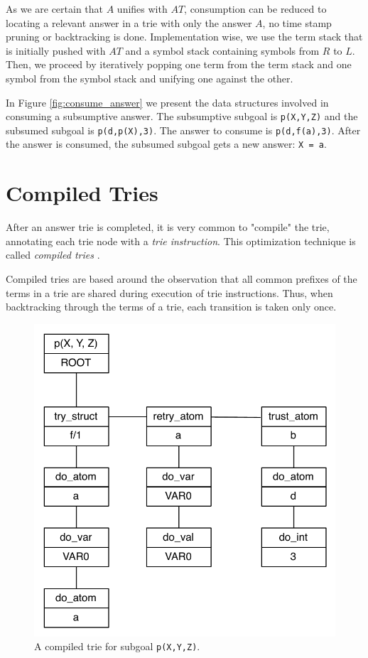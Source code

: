 As we are certain that $A$ unifies with $AT$, consumption can be reduced to locating a relevant
answer in a trie with only the answer $A$, no time stamp pruning or backtracking is done.
Implementation wise, we use the term stack that is initially pushed with $AT$
and a symbol stack containing symbols from $R$ to $L$. Then, we proceed by
iteratively popping one term from the term stack and one symbol from the symbol stack
and unifying one against the other.

In Figure \ref{fig:consume_answer} we present the data structures involved in consuming
a subsumptive answer. The subsumptive subgoal is \texttt{p(X,Y,Z)} and the
subsumed subgoal is \texttt{p(d,p(X),3)}. The answer to consume is \texttt{p(d,f(a),3)}.
After the answer is consumed, the subsumed subgoal gets a new answer: \texttt{X = a}.

\section{Compiled Tries}\label{sec:compiled_tries}

After an answer trie is completed, it is very common to "compile" the trie,
annotating each trie node with a \textit{trie instruction}. This optimization technique
is called \textit{compiled tries} \cite{RamakrishnanIV-99}.

Compiled tries are based around the observation that all common prefixes of the terms in a trie
are shared during execution of trie instructions. Thus, when backtracking
through the terms of a trie, each transition is taken only once.

\begin{figure}[H]
  \centering
    \includegraphics[scale=0.6]{compiled_trie.pdf}
  \caption{A compiled trie for subgoal \texttt{p(X,Y,Z)}.}
  \label{fig:compiled_trie}
\end{figure}

